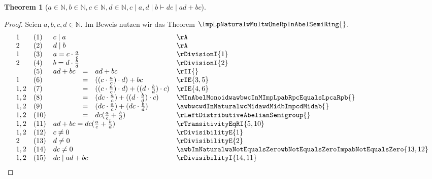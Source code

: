 \documentclass{book}
\theoremstyle{plain}
\newtheorem{theorem}{Theorem}
\theoremstyle{remark}
\theoremstyle{definition}
\begin{document}
\label{aInNaturalwbInNaturalwcInNaturalwdInNaturalwcMidawdMidbImpdcMidadPlusbc}
\begin{theorem}[\(a\in\mathbb{N},b\in\mathbb{N}, c\in\mathbb{N}, d\in\mathbb{N},c\mid a, d\mid b\vdash dc\mid ad+bc\)]
\end{theorem}
\begin{proof}
Seien \(a,b,c,d\in\mathbb{N}\).
Im Beweis nutzen wir das Theorem \(\ImpLpNaturalwMultwOneRpInAbelSemiRing{}\). 
    \[
	\begin{array}{llclll}
    1       &  (1)  & \multicolumn{3}{l}{c\mid a} & \rA \\
    2       &  (2)  & \multicolumn{3}{l}{d\mid b} & \rA \\
    1       &  (3)  & \multicolumn{3}{l}{a=c\cdot \frac{a}{c}} & \rDivisionI{1} \\
    2       &  (4)  & \multicolumn{3}{l}{b=d\cdot \frac{b}{d}} & \rDivisionI{2} \\
            &  (5)  & ad+bc&=&ad+bc & \rII{} \\
    1       &  (6)  & &=&((c\cdot \frac{a}{c})\cdot d)+ bc & \rIE{3,5} \\
    1,2     &  (7)  & &=&((c\cdot \frac{a}{c})\cdot d)+((d\cdot \frac{b}{d})\cdot c) & \rIE{4,6} \\
    1,2     &  (8)  & &=&(dc\cdot \frac{a}{c})+((d\cdot \frac{b}{d})\cdot c) & \MInAbelMonoidwawbwcInMImpLpabRpcEqualsLpcaRpb{} \\
    1,2     &  (9)  & &=&(dc\cdot \frac{a}{c})+(dc\cdot \frac{b}{d}) & \awbwcwdInNaturalwcMidawdMidbImpcdMidab{} \\
    1,2     &  (10)  & &=&dc(\frac{a}{c}+\frac{b}{d}) & \rLeftDistributiveAbelianSemigroup{} \\
    1,2     &  (11) &\multicolumn{3}{l}{ad+bc=dc(\frac{a}{c}+\frac{b}{d})} & \rTransitivityEqRI{5,10} \\
    1,2     &  (12)  & \multicolumn{3}{l}{c\neq 0} & \rDivisibilityE{1} \\
    2       &  (13)  & \multicolumn{3}{l}{d\neq 0} & \rDivisibilityE{2} \\
    1,2     &  (14)  & \multicolumn{3}{l}{dc\neq 0} & \awbInNaturalwaNotEqualsZerowbNotEqualsZeroImpabNotEqualsZero{13,12} \\
    1,2     &  (15)  & \multicolumn{3}{l}{dc\mid ad+bc} & \rDivisibilityI{14,11} \\
    \end{array}
	\]
\end{proof}
\end{document}
